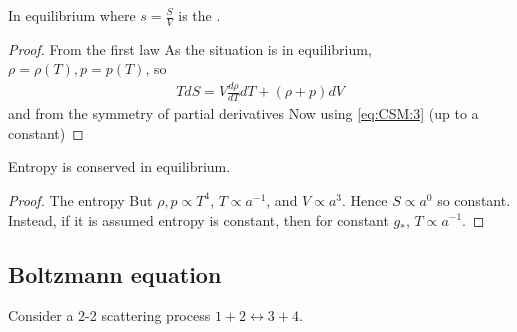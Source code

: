 \documentclass{article}
\begin{document}
\begin{prop}
In equilibrium
where $s=\frac{S}{V}$ is the .
\end{prop}
\begin{proof}
From the first law
As the situation is in equilibrium, $\rho=\rho(T), p=p(T)$, so 
\begin{align} \label{eq:CSM:3}
TdS = V \frac{d\rho}{dT} dT + (\rho + p) dV
\end{align}
and from the symmetry of partial derivatives 
Now using \ref{eq:CSM:3} 
(up to a constant)
\end{proof}

\begin{prop}
Entropy is conserved in equilibrium.
\end{prop}
\begin{proof}
The entropy 
But $\rho,p \propto T^4$, $T\propto a^{-1}$, and $V\propto a^3$. Hence $S \propto a^0$ so constant. Instead, if it is assumed entropy is constant, then for constant $g_\ast$, $T\propto a^{-1}$. 
\end{proof}

\subsection{Boltzmann equation}
Consider a 2-2 scattering process $1+2 \leftrightarrow 3+4$. 
\end{document}
